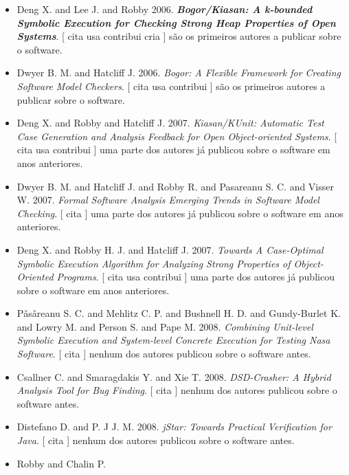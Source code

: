 \begin{itemize}
\item Deng X. and Lee J. and Robby
      2006.
        \textbf{\textit{ Bogor/Kiasan: A k-bounded Symbolic Execution for Checking Strong Heap Properties of Open Systems}}.
      [
          cita
          usa
          contribui
          cria
      ]
são os primeiros autores a publicar sobre o software.
\item Dwyer B. M. and Hatcliff J.
      2006.
        \textit{ Bogor: A Flexible Framework for Creating Software Model Checkers}.
      [
          cita
          usa
          contribui
      ]
são os primeiros autores a publicar sobre o software.
\item Deng X. and Robby and Hatcliff J.
      2007.
        \textit{ Kiasan/KUnit: Automatic Test Case Generation and Analysis Feedback for Open Object-oriented Systems}.
      [
          cita
          usa
          contribui
      ]
uma parte dos autores já publicou sobre o software em anos anteriores.
\item Dwyer B. M. and Hatcliff J. and Robby R. and Pasareanu S. C. and Visser W.
      2007.
        \textit{ Formal Software Analysis Emerging Trends in Software Model Checking}.
      [
          cita
      ]
uma parte dos autores já publicou sobre o software em anos anteriores.
\item Deng X. and Robby H. J. and Hatcliff J.
      2007.
        \textit{ Towards A Case-Optimal Symbolic Execution Algorithm for Analyzing Strong Properties of Object-Oriented Programs}.
      [
          cita
          usa
          contribui
      ]
uma parte dos autores já publicou sobre o software em anos anteriores.
\item P\v{a}s\v{a}reanu S. C. and Mehlitz C. P. and Bushnell H. D. and Gundy-Burlet K. and Lowry M. and Person S. and Pape M.
      2008.
        \textit{ Combining Unit-level Symbolic Execution and System-level Concrete Execution for Testing Nasa Software}.
      [
          cita
      ]
nenhum dos autores publicou sobre o software antes.
\item Csallner C. and Smaragdakis Y. and Xie T.
      2008.
        \textit{ DSD-Crasher: A Hybrid Analysis Tool for Bug Finding}.
      [
          cita
      ]
nenhum dos autores publicou sobre o software antes.
\item Distefano D. and P. J J. M.
      2008.
        \textit{ jStar: Towards Practical Verification for Java}.
      [
          cita
      ]
nenhum dos autores publicou sobre o software antes.
\item Robby and Chalin P.

\end{itemize}
